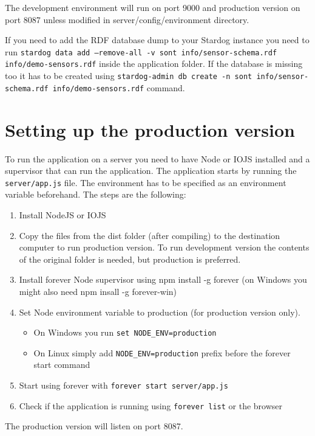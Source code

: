 The development environment will run on port 9000 and production version on port 8087 unless modified in server/config/environment directory.

If you need to add the RDF database dump to your Stardog instance you need to run \texttt{stardog data add --remove-all -v sont info/sensor-schema.rdf info/demo-sensors.rdf} inside the application folder. If the database is missing too it has to be created using \texttt{stardog-admin db create -n sont info/sensor-schema.rdf info/demo-sensors.rdf} command.

\section{Setting up the production version}

To run the application on a server you need to have Node or IOJS installed and a supervisor that can run the application. The application starts by running the \texttt{server/app.js} file. The environment has to be specified as an environment variable beforehand. The steps are the following:
\begin{enumerate}
\item Install NodeJS or IOJS
\item Copy the files from the dist folder (after compiling) to the destination computer to run production version. To run development version the contents of the original folder is needed, but production is preferred.
\item Install forever Node supervisor using npm install -g forever (on Windows you might also need npm insall -g forever-win)
\item Set Node environment variable to production (for production version only).
\begin{itemize}
\item On Windows you run \texttt{set NODE\_ENV=production}
\item On Linux simply add \texttt{NODE\_ENV=production} prefix before the forever start command
\end{itemize}
\item Start using forever with \texttt{forever start server/app.js}
\item Check if the application is running using \texttt{forever list} or the browser
\end{enumerate}
The production version will listen on port 8087.
\newpage
